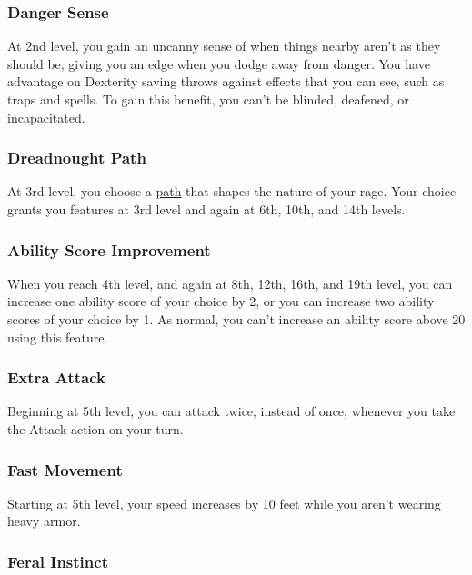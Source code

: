 \subsubsection{Danger Sense}\label{dreadnought-feature-danger-sense}

At 2nd level, you gain an uncanny sense of when things nearby aren't as
they should be, giving you an edge when you dodge away from danger. You
have advantage on Dexterity saving throws against effects that you can
see, such as traps and spells. To gain this benefit, you can't be
blinded, deafened, or incapacitated.

\subsubsection{Dreadnought Path}\label{dreadnought-feature-path}

At 3rd level, you choose a \hyperref[dreadnought-subclasses]{path} that
shapes the nature of your rage. Your choice grants you features at 3rd
level and again at 6th, 10th, and 14th levels.

\subsubsection{Ability Score Improvement}\label{dreadnought-feature-asi}

When you reach 4th level, and again at 8th, 12th, 16th, and 19th level,
you can increase one ability score of your choice by 2, or you can
increase two ability scores of your choice by 1. As normal, you can't
increase an ability score above 20 using this feature.

\subsubsection{Extra Attack}\label{dreadnought-feature-extra-attack}

Beginning at 5th level, you can attack twice, instead of once, whenever
you take the Attack action on your turn.

\subsubsection{Fast Movement}\label{dreadnought-feature-fast-movement}

Starting at 5th level, your speed increases by 10 feet while you aren't
wearing heavy armor.

\subsubsection{Feral Instinct}\label{dreadnought-feature-feral-instinct}

